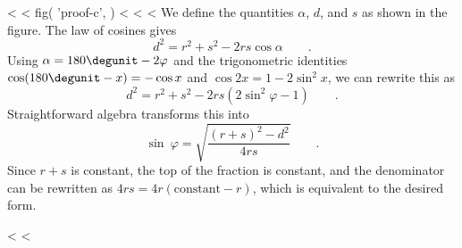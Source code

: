 <%
<%
  fig(
    'proof-c',
  )
<%
<%
<%
We define the quantities $\alpha$, $d$, and $s$ as shown in
the figure. The law of cosines gives
\begin{equation*}
 d^2 = r^2+s^2-2rs\cos\alpha \qquad .
\end{equation*}
Using $\alpha =180\degunit-2\varphi$ and the trigonometric
identities $\cos (180\degunit-x)=-\cos x$ and
$\cos 2x= 1-2 \sin^2 x$, we can rewrite this as
\begin{equation*}
       d^2 = r^2 + s^2 - 2rs\left(2\sin^2\varphi-1\right) \qquad .
\end{equation*}
Straightforward algebra transforms this into
\begin{equation*}
  \sin\:\varphi = \sqrt{\frac{(r+s)^2-d^2}{4rs}} \qquad .
\end{equation*}
Since $r+s$ is constant, the top of the fraction is
constant, and the denominator can be rewritten as $4rs=4r(\text{constant}-r)$,
which is equivalent to the desired form.

<%
<%
